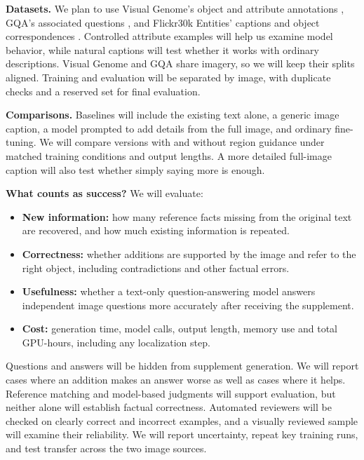 \documentclass[11pt,twocolumn]{article}
\makeatletter
\renewcommand\section{\@startsection{section}{1}{0pt}{8pt plus 2pt minus 1pt}{4pt}{\large\bfseries}}
\makeatother
\begin{document}
\section{Data and Evaluation}
\textbf{Datasets.} We plan to use Visual Genome's object and attribute
annotations \cite{krishna}, GQA's associated questions \cite{hudson}, and
Flickr30k Entities' captions and object correspondences \cite{plummer}.
Controlled attribute examples will help us examine model behavior, while
natural captions will test whether it works with ordinary descriptions.
Visual Genome and GQA share imagery, so we will keep their splits aligned.
Training and evaluation will be separated by image, with duplicate checks and
a reserved set for final evaluation.

\textbf{Comparisons.} Baselines will include the existing text alone, a generic
image caption, a model prompted to add details from the full image, and ordinary
fine-tuning. We will compare versions with and without region guidance under
matched training conditions and output lengths. A more detailed full-image
caption will also test whether simply saying more is enough.

\textbf{What counts as success?} We will evaluate:
\begin{itemize}
\item \textbf{New information:} how many reference facts missing from the
original text are recovered, and how much existing information is repeated.
\item \textbf{Correctness:} whether additions are supported by the image and
refer to the right object, including contradictions and other factual errors.
\item \textbf{Usefulness:} whether a text-only question-answering model answers
independent image questions more accurately after receiving the supplement.
\item \textbf{Cost:} generation time, model calls, output length, memory use
and total GPU-hours, including any localization step.
\end{itemize}

Questions and answers will be hidden from supplement generation. We will
report cases where an addition makes an answer worse as well as cases where it
helps. Reference matching and model-based judgments will support evaluation,
but neither alone will establish factual correctness. Automated reviewers will
be checked on clearly correct and incorrect examples, and a visually reviewed
sample will examine their reliability. We will report uncertainty, repeat key
training runs, and test transfer across the two image sources.
\end{document}
